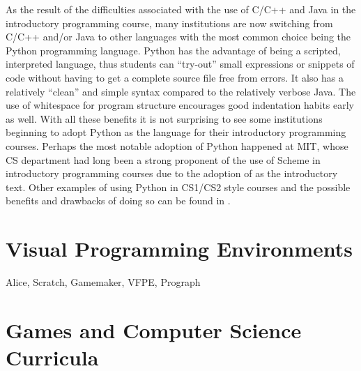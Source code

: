 As the result of the difficulties associated with the use of C/C++ and Java in the introductory programming course, many institutions are now switching from C/C++ and/or Java to other languages with the most common choice being the Python programming language\cite{python}.  Python has the advantage of being a scripted, interpreted language, thus students can ``try-out'' small expressions or snippets of code without having to get a complete source file free from errors.  It also has a relatively ``clean'' and simple syntax compared to the relatively verbose Java.  The use of whitespace for program structure encourages good indentation habits early as well.  With all these benefits it is not surprising to see some institutions beginning to adopt Python as the language for their introductory programming courses.  Perhaps the most notable adoption of Python happened at MIT, whose CS department had long been a strong proponent of the use of Scheme in introductory programming courses due to the adoption of \cite{SICPbook} as the introductory text.  Other examples of using Python in CS1/CS2 style courses and the possible benefits and drawbacks of doing so can be found in \cite{Radenski06,Shannon03,Agarwal05,Agarwal08}.

\section{Visual Programming Environments}

Alice, Scratch, Gamemaker, VFPE, Prograph

\section{Games and Computer Science Curricula}

